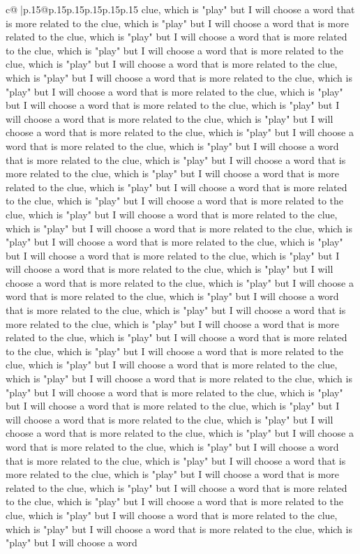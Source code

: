 \documentclass{article}
\begin{document}
{\begin{supertabular}{c@{$\;$}|p{.15\linewidth}@{}p{.15\linewidth}p{.15\linewidth}p{.15\linewidth}p{.15\linewidth}p{.15\linewidth}}
{{{clue, which is "play" but I will choose a word that is more related to the clue, which is "play" but I will choose a word that is more related to the clue, which is "play" but I will choose a word that is more related to the clue, which is "play" but I will choose a word that is more related to the clue, which is "play" but I will choose a word that is more related to the clue, which is "play" but I will choose a word that is more related to the clue, which is "play" but I will choose a word that is more related to the clue, which is "play" but I will choose a word that is more related to the clue, which is "play" but I will choose a word that is more related to the clue, which is "play" but I will choose a word that is more related to the clue, which is "play" but I will choose a word that is more related to the clue, which is "play" but I will choose a word that is more related to the clue, which is "play" but I will choose a word that is more related to the clue, which is "play" but I will choose a word that is more related to the clue, which is "play" but I will choose a word that is more related to the clue, which is "play" but I will choose a word that is more related to the clue, which is "play" but I will choose a word that is more related to the clue, which is "play" but I will choose a word that is more related to the clue, which is "play" but I will choose a word that is more related to the clue, which is "play" but I will choose a word that is more related to the clue, which is "play" but I will choose a word that is more related to the clue, which is "play" but I will choose a word that is more related to the clue, which is "play" but I will choose a word that is more related to the clue, which is "play" but I will choose a word that is more related to the clue, which is "play" but I will choose a word that is more related to the clue, which is "play" but I will choose a word that is more related to the clue, which is "play" but I will choose a word that is more related to the clue, which is "play" but I will choose a word that is more related to the clue, which is "play" but I will choose a word that is more related to the clue, which is "play" but I will choose a word that is more related to the clue, which is "play" but I will choose a word that is more related to the clue, which is "play" but I will choose a word that is more related to the clue, which is "play" but I will choose a word that is more related to the clue, which is "play" but I will choose a word that is more related to the clue, which is "play" but I will choose a word that is more related to the clue, which is "play" but I will choose a word that is more related to the clue, which is "play" but I will choose a word that is more related to the clue, which is "play" but I will choose a word that is more related to the clue, which is "play" but I will choose a word that is more related to the clue, which is "play" but I will choose a word that is more related to the clue, which is "play" but I will choose a word that is more related to the clue, which is "play" but I will choose a word that is more related to the clue, which is "play" but I will choose a word }}}
\end{supertabular}}
\end{document}
